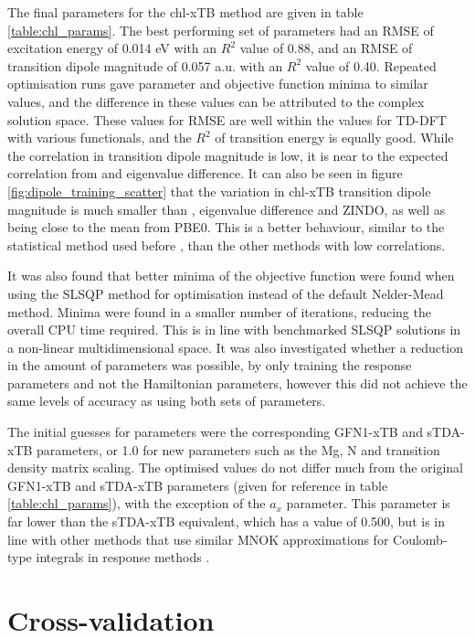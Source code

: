 The final parameters for the chl-xTB method are given in table \ref{table:chl_params}.
The best performing set of parameters had an RMSE of excitation energy of 0.014 eV 
with an $R^2$ value of 0.88, and an RMSE of transition dipole magnitude of 0.057 a.u. 
with an $R^2$ value of 0.40. Repeated optimisation runs gave parameter and objective
function minima to similar values, and the difference in these values can be attributed
to the complex solution space. These values for RMSE are well within the values
for TD-DFT with various functionals, and the $R^2$ of transition energy is equally
good. While the correlation in transition dipole magnitude is low, it is near to
the expected correlation from \dscf and eigenvalue difference. It can also be seen
in figure \ref{fig:dipole_training_scatter} that the variation in chl-xTB transition
dipole magnitude is much smaller than \dscf, eigenvalue difference and ZINDO, as
well as being close to the mean from PBE0. This is a better behaviour, similar to
the statistical method used before \cite{Stross2016}, than the other methods with 
low correlations.

It was also found that better minima of the objective function were found when using
the SLSQP method for optimisation instead of the default Nelder-Mead method. Minima
were found in a smaller number of iterations, reducing the overall CPU time required.
This is in line with benchmarked SLSQP solutions in a non-linear multidimensional space.
It was also investigated whether a reduction in the amount of parameters was possible,
by only training the response parameters and not the Hamiltonian parameters, however 
this did not achieve the same levels of accuracy as using both sets of parameters.

The initial guesses for parameters were the corresponding GFN1-xTB and sTDA-xTB
parameters, or 1.0 for new parameters such as the Mg, N and transition density matrix
scaling. The optimised values do not differ much from the original GFN1-xTB and 
sTDA-xTB parameters (given for reference in table \ref{table:chl_params}), with
the exception of the $a_x$ parameter. This parameter is far lower than the sTDA-xTB
equivalent, which has a value of 0.500, but is in line with other methods that use 
similar MNOK approximations for Coulomb-type integrals in response methods \cite{Cho2021}.

\afterpartskip
\section{Cross-validation}
\label{sec:chl_benchmarking}

